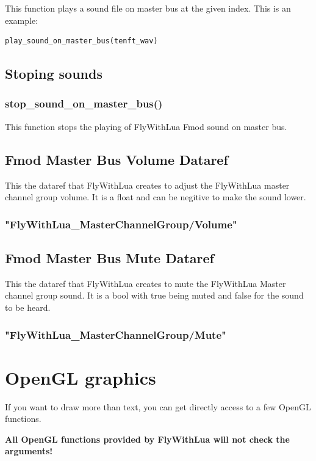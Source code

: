\documentclass[11pt,parskip=half,a4paper]{scrartcl}
\begin{document}
This function plays a sound file on master bus at the given index. This is an example:


\begin{lstlisting}
play_sound_on_master_bus(tenft_wav)
\end{lstlisting}

\subsection{Stoping sounds}
\subsubsection{ stop\_sound\_on\_master\_bus()}
This function stops the playing of FlyWithLua Fmod sound on master bus.

\subsection{Fmod Master Bus Volume Dataref}
This the dataref that FlyWithLua creates to adjust the FlyWithLua master channel group volume. It is a float and can be negitive to make the sound lower.

\subsubsection{"FlyWithLua\_MasterChannelGroup/Volume"}

\subsection{Fmod Master Bus Mute Dataref}
This the dataref that FlyWithLua creates to mute the FlyWithLua Master channel group sound. It is a bool with true being muted and false for the sound to be heard.

\subsubsection{"FlyWithLua\_MasterChannelGroup/Mute"}


\newpage
\section{OpenGL graphics}

If you want to draw more than text, you can get directly access to a few OpenGL functions.

\textbf{All OpenGL functions provided by FlyWithLua will not check the arguments!}
\end{document}
